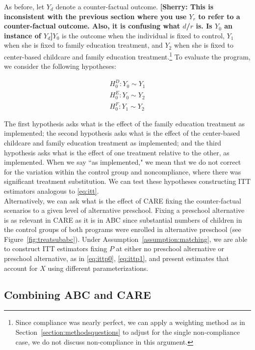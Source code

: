 \noindent As before, let $Y_{d}$ denote a counter-factual outcome. \textbf{[Sherry: This is inconsistent with the previous section where you use $Y_{r}$ to refer to a counter-factual outcome. Also, it is confusing what $d$/$r$ is. Is $Y_{0}$ an instance of $Y_{d}$]}$Y_{0}$ is the outcome when the individual is fixed to control, $Y_{1}$ when she is fixed to family education treatment, and $Y_{2}$ when she is fixed to center-based childcare and family education treatment.\footnote{Since compliance was nearly perfect, we can apply a weighting method as in Section~\ref{section:methodsquestions} to adjust for the single non-compliance case, we do not discuss non-compliance in this argument.} To evaluate the program, we consider the following hypotheses: 

\begin{eqnarray}
H_{0}^D: Y_{0} \sim Y_{1} \\ 
H_{0}^E: Y_{0} \sim Y_{2} \\
H_{0}^F: Y_{1} \sim Y_{2} 
\end{eqnarray}

\noindent The first hypothesis asks what is the effect of the family education treatment as implemented; the second hypothesis asks what is the effect of the center-based childcare and family education treatment as implemented; and the third hypothesis asks what is the effect of one treatment relative to the other, as implemented. When we say ``as implemented," we mean that we do not correct for the variation within the control group and noncompliance, where there was significant treatment substitution. We can test these hypotheses constructing ITT estimators analogous to \eqref{eq:itt}.\\ 

\noindent Alternatively, we can ask what is the effect of CARE fixing the counter-factual scenarios to a given level of alternative preschool. Fixing a preschool alternative is as relevant in CARE as it is in ABC since substantial numbers of children in the control groups of both programs were enrolled in alternative preschool (see Figure~\ref{fig:treatsubabc}). Under Assumption~\ref{assumption:matching}, we are able to construct ITT estimators fixing $P$ at either no preschool alternative or preschool alternative, as in \eqref{eq:ittp0}, \eqref{eq:ittp1}, and present estimates that account for $X$ using different parameterizations.\\

\subsection{Combining ABC and CARE}

